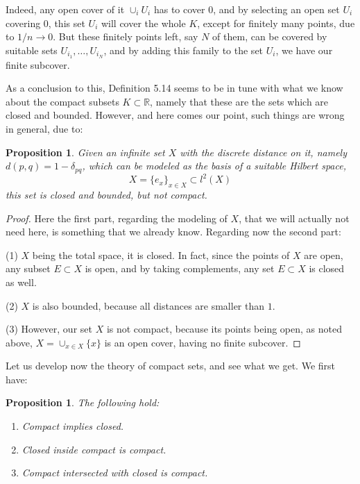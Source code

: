 \documentclass[12pt]{amsbook}
\newtheorem{proposition}[theorem]{Proposition}
\begin{document}
Indeed, any open cover of it $\cup_iU_i$ has to cover 0, and by selecting an open set $U_i$ covering 0, this set $U_i$ will cover the whole $K$, except for finitely many points, due to $1/n\to0$. But these finitely points left, say $N$ of them, can be covered by suitable sets $U_{i_1},\ldots,U_{i_N}$, and by adding this family to the set $U_i$, we have our finite subcover.

\bigskip

As a conclusion to this, Definition 5.14 seems to be in tune with what we know about the compact subsets $K\subset\mathbb R$, namely that these are the sets which are closed and bounded. However, and here comes our point, such things are wrong in general, due to:

\begin{proposition}
Given an infinite set $X$ with the discrete distance on it, namely $d(p,q)=1-\delta_{pq}$, which can be modeled as the basis of a suitable Hilbert space,
$$X=\{e_x\}_{x\in X}\subset l^2(X)$$
this set is closed and bounded, but not compact.
\end{proposition}

\begin{proof}
Here the first part, regarding the modeling of $X$, that we will actually not need here, is something that we already know. Regarding now the second part:

\medskip

(1) $X$ being the total space, it is closed. In fact, since the points of $X$ are open, any subset $E\subset X$ is open, and by taking complements, any set $E\subset X$ is closed as well.

\medskip

(2) $X$ is also bounded, because all distances are smaller than $1$.

\medskip

(3) However, our set $X$ is not compact, because its points being open, as noted above, $X=\cup_{x\in X}\{x\}$ is an open cover, having no finite subcover.
\end{proof}

Let us develop now the theory of compact sets, and see what we get. We first have:

\begin{proposition}
The following hold:
\begin{enumerate}
\item Compact implies closed.

\item Closed inside compact is compact.

\item Compact intersected with closed is compact.
\end{enumerate}
\end{proposition}
\end{document}
